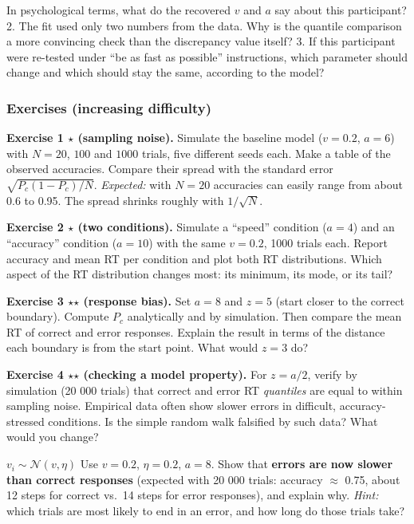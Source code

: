 In psychological terms, what do the recovered \(v\) and \(a\) say about
this participant? 2. The fit used only two numbers from the data. Why is
the quantile comparison a more convincing check than the discrepancy
value itself? 3. If this participant were re-tested under ``be as fast
as possible'' instructions, which parameter should change and which
should stay the same, according to the model?

\subsubsection{Exercises (increasing difficulty)}

\textbf{Exercise 1 \ensuremath{\star} (sampling noise).} Simulate the baseline model
(\(v = 0.2\), \(a = 6\)) with \(N = 20\), \(100\) and \(1000\) trials,
five different seeds each. Make a table of the observed accuracies.
Compare their spread with the standard error \(\sqrt{P_c(1-P_c)/N}\).
\emph{Expected:} with \(N = 20\) accuracies can easily range from about
0.6 to 0.95. The spread shrinks roughly with \(1/\sqrt{N}\).

\textbf{Exercise 2 \ensuremath{\star} (two conditions).} Simulate a ``speed'' condition
(\(a = 4\)) and an ``accuracy'' condition (\(a = 10\)) with the same
\(v = 0.2\), 1000 trials each. Report accuracy and mean RT per condition
and plot both RT distributions. Which aspect of the RT distribution
changes most: its minimum, its mode, or its tail?

\textbf{Exercise 3 \ensuremath{\star}\ensuremath{\star} (response bias).} Set \(a = 8\) and \(z = 5\)
(start closer to the correct boundary). Compute \(P_c\) analytically and
by simulation. Then compare the mean RT of correct and error responses.
Explain the result in terms of the distance each boundary is from the
start point. What would \(z = 3\) do?

\textbf{Exercise 4 \ensuremath{\star}\ensuremath{\star} (checking a model property).} For \(z = a/2\),
verify by simulation (20 000 trials) that correct and error RT
\emph{quantiles} are equal to within sampling noise. Empirical data
often show slower errors in difficult, accuracy-stressed conditions. Is
the simple random walk falsified by such data? What would you change?

\(v_i \sim \mathcal{N}(v, \eta)\) Use \(v = 0.2\), \(\eta = 0.2\),
\(a = 8\). Show that \textbf{errors are now slower than correct
responses} (expected with 20 000 trials: accuracy \ensuremath{\approx} 0.75, about 12 steps
for correct vs.~14 steps for error responses), and explain why.
\emph{Hint:} which trials are most likely to end in an error, and how
long do those trials take?

